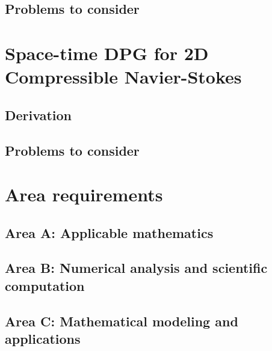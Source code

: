 \documentclass[12pt]{report}
\begin{document}
\subsection{Problems to consider}


\section{Space-time DPG for 2D Compressible Navier-Stokes}

\subsection{Derivation}

\subsection{Problems to consider}


\section{Area requirements}

\subsection{Area A: Applicable mathematics}

\subsection{Area B: Numerical analysis and scientific computation}

\subsection{Area C: Mathematical modeling and applications}
\end{document}

